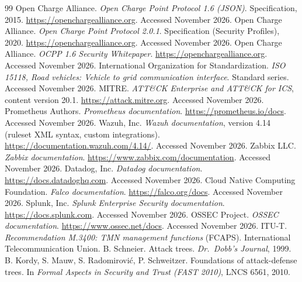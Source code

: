 \documentclass[a4paper,11pt]{article}
\numberwithin{table}{section}
\begin{document}
\begin{thebibliography}{99}
\small
\setlength{\itemsep}{0.2em}
 Open Charge Alliance. \emph{Open Charge Point Protocol 1.6 (JSON)}. Specification, 2015. \url{https://openchargealliance.org}. Accessed November 2026.
 Open Charge Alliance. \emph{Open Charge Point Protocol 2.0.1}. Specification (Security Profiles), 2020. \url{https://openchargealliance.org}. Accessed November 2026.
 Open Charge Alliance. \emph{OCPP 1.6 Security Whitepaper}. \url{https://openchargealliance.org}. Accessed November 2026.
 International Organization for Standardization. \emph{ISO 15118, Road vehicles: Vehicle to grid communication interface}. Standard series. Accessed November 2026.
 MITRE. \emph{ATT\&CK Enterprise and ATT\&CK for ICS}, content version 20.1. \url{https://attack.mitre.org}. Accessed November 2026.
 Prometheus Authors. \emph{Prometheus documentation}. \url{https://prometheus.io/docs}. Accessed November 2026.
 Wazuh, Inc. \emph{Wazuh documentation}, version 4.14 (ruleset XML syntax, custom integrations). \url{https://documentation.wazuh.com/4.14/}. Accessed November 2026.
 Zabbix LLC. \emph{Zabbix documentation}. \url{https://www.zabbix.com/documentation}. Accessed November 2026.
 Datadog, Inc. \emph{Datadog documentation}. \url{https://docs.datadoghq.com}. Accessed November 2026.
 Cloud Native Computing Foundation. \emph{Falco documentation}. \url{https://falco.org/docs}. Accessed November 2026.
 Splunk, Inc. \emph{Splunk Enterprise Security documentation}. \url{https://docs.splunk.com}. Accessed November 2026.
 OSSEC Project. \emph{OSSEC documentation}. \url{https://www.ossec.net/docs}. Accessed November 2026.
 ITU-T. \emph{Recommendation M.3400: TMN management functions} (FCAPS). International Telecommunication Union.
 B. Schneier. Attack trees. \emph{Dr.\ Dobb's Journal}, 1999.
 B. Kordy, S. Mauw, S. Radomirovi\'c, P. Schweitzer. Foundations of attack-defense trees. In \emph{Formal Aspects in Security and Trust (FAST 2010)}, LNCS 6561, 2010.
\end{thebibliography}
\end{document}
